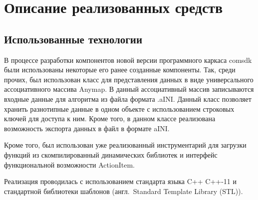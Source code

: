 \chapter{Описание реализованных средств}\label{chap4_soft_testing}
\section{Использованные технологии}\label{sec:used_tech}
В процессе разработки компонентов новой версии программного каркаса comsdk были использованы некоторые его ранее созданные компоненты. Так, среди прочих, был использован класс для представления данных в виде универсального ассоциативного массива \textsf{Anymap}. В данный ассоциативный массив записываются входные данные для алгоритма из файла формата .aINI\cite{SokAINI}. Данный класс позволяет хранить разнотипные данные в одном объекте с использованием строковых ключей для доступа к ним. Кроме того, в данном классе реализована возможность экспорта данных в файл в формате aINI.

Кроме того, был использован уже реализованный инструментарий для загрузки функций из скомпилированный динамических библиотек и интерфейс функциональной возможности \textsf{ActionItem}.

Реализация проводилась с использованием стандарта языка C++ C++-11 и стандартной библиотеки шаблонов (англ.~Standard Template Library (STL)).

